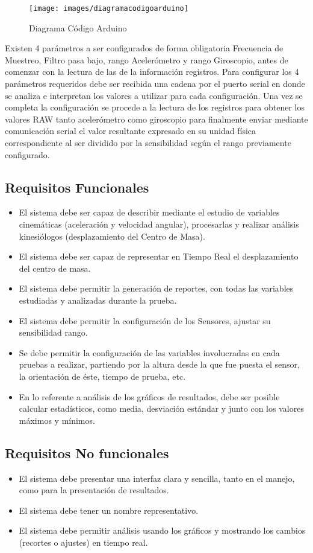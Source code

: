 \documentclass[12pt,a4paper]{article}
\begin{document}
\begin{figure}[H]
	\centering
	\texttt{[image: images/diagramacodigoarduino]}
	\caption{Diagrama Código Arduino}
	\label{fig:arduinocode}
\end{figure}

Existen 4 parámetros a ser configurados de forma obligatoria Frecuencia de Muestreo, Filtro pasa bajo, rango Acelerómetro y rango Giroscopio, antes de comenzar con la lectura de las de la información registros.
Para configurar los 4 parámetros requeridos debe ser recibida una cadena por el puerto serial en donde se analiza e interpretan los valores a utilizar para cada configuración. 
Una vez se completa la configuración se procede a la lectura de los registros para obtener los valores RAW tanto acelerómetro como giroscopio para finalmente enviar mediante comunicación serial el valor resultante expresado en su unidad física correspondiente al ser dividido por la sensibilidad según el rango previamente configurado.

\subsection{Requisitos Funcionales}
\begin{itemize}
	\item El sistema debe ser capaz de describir mediante el estudio de variables cinemáticas (aceleración y velocidad angular), procesarlas y realizar análisis kinesiólogos (desplazamiento del Centro de Masa).
	\item El sistema debe ser capaz de representar en Tiempo Real el desplazamiento del centro de masa.
	\item El sistema debe permitir la generación de reportes, con todas las variables estudiadas y analizadas durante la prueba.
	\item El sistema debe permitir la configuración de los Sensores, ajustar su sensibilidad rango.
	\item Se debe permitir la configuración de las variables involucradas en cada pruebas a realizar, partiendo por la altura desde la que fue puesta el sensor, la orientación de éste, tiempo de prueba, etc.
	\item En lo referente a análisis de los gráficos de resultados, debe ser posible calcular estadísticos, como media, desviación estándar y junto con los valores máximos y mínimos.
\end{itemize} 

\subsection{Requisitos No funcionales}
\begin{itemize}
	\item El sistema debe presentar una interfaz clara y sencilla, tanto en el manejo, como para la presentación de resultados.
	\item El sistema debe tener un nombre representativo.
	\item El sistema debe permitir análisis usando los gráficos y mostrando los cambios (recortes o ajustes) en tiempo real.
\end{itemize}
\end{document}

